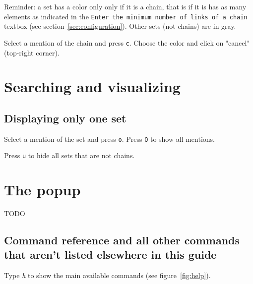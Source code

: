 \documentclass[12pt]{article}
\begin{document}
Reminder: a set has a color only only if it is a chain, that is if it is has
as many elements as indicated in the
\verb|Enter the minimum number of links of a chain| textbox (see
section~\ref{sec:configuration}).  Other sets (not chains) are in gray.

Select a mention of the chain and press \verb|c|.  Choose the color and click
on "cancel" (top-right corner).


 \section{Searching and visualizing}

 \subsection{Displaying only one set}

Select a mention of the set and press \verb|o|.  Press \verb|O| to show all
mentions.

Press \verb|u| to hide all sets that are not chains.

 \section{The popup}

TODO


 \subsection{Command reference and all other commands that aren't listed
 elsewhere in this guide}

Type \emph{h} to show the main available commands (see figure~\ref{fig:help}).
\end{document}
